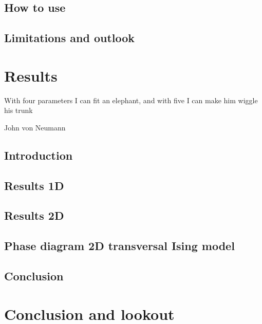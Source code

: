 \documentclass{book}
\newcounter{a}
\newcounter{b}
\begin{document}
\section{How to use}\label{sec:H5:source_code}


\section{Limitations and outlook}


\chapter{Results} \label{chap:results}

\epigraph{With four parameters I can fit an elephant, and with five I can make him wiggle his trunk}{John von Neumann}

%

\section{Introduction}


\section{Results 1D}\label{sec:results1d}


\section{Results 2D}\label{sec:results2d}


\section{Phase diagram 2D transversal Ising model} \label{subsec:2dpahsediag}


\section{Conclusion}


\chapter{Conclusion and lookout}






\clearpage{\thispagestyle{empty}\cleardoublepage}
\end{document}
